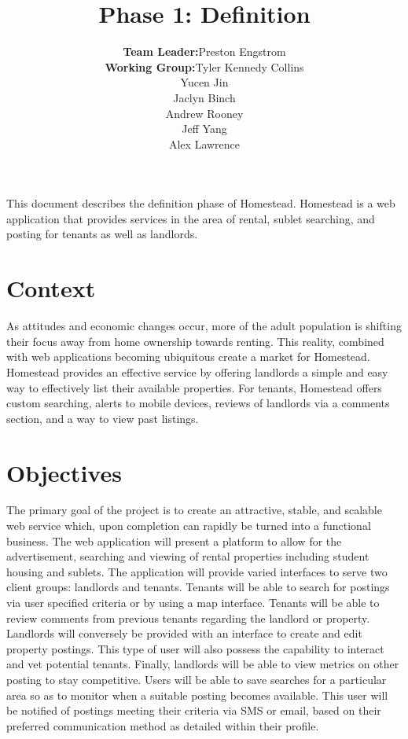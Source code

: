 \documentclass[]{article}
\title{Phase 1: Definition}
\author{ \begin{tabular}{rl}
		\textbf{Team Leader:} & Preston Engstrom \\
		\textbf{Working Group:} & Tyler Kennedy Collins\\ & Yucen Jin \\ & Jaclyn Binch  \\ & Andrew Rooney \\ & Jeff Yang \\ & Alex Lawrence
	\end{tabular}}
\date{}
\begin{document}
\maketitle

\thispagestyle{fancy}

\abstract
This document describes the definition phase of Homestead. Homestead is a web application that provides services in the area of rental, sublet searching, and posting for tenants as well as landlords.

\section{Context}
As attitudes and economic changes occur, more of the adult population is shifting their focus away from home ownership towards renting. This reality, combined with web applications becoming ubiquitous create a market for Homestead. \\Homestead provides an effective service by offering landlords a simple and easy way to effectively list their available properties. For tenants, Homestead offers custom searching, alerts to mobile devices, reviews of landlords via a comments section, and a way to view past listings.

\section{Objectives}
The primary goal of the project is to create an attractive, stable, and scalable web service which, upon completion can rapidly be turned into a functional business. The web application will present a platform to allow for the advertisement, searching and viewing of rental properties including student housing and sublets. The application will provide varied interfaces to serve two client groups: landlords and tenants. Tenants will be able to search for postings via user specified criteria or by using a map interface. Tenants will be able to review comments from previous tenants regarding the landlord or property. Landlords will conversely be provided with an interface to create and edit property postings. This type of user will also possess the capability to interact and vet potential tenants. Finally, landlords will be able to view metrics on other posting to stay competitive. Users will be able to save searches for a particular area so as to monitor when a suitable posting becomes available. This user will be notified of postings meeting their criteria via SMS or email, based on their preferred communication method as detailed within their profile.
\end{document}
